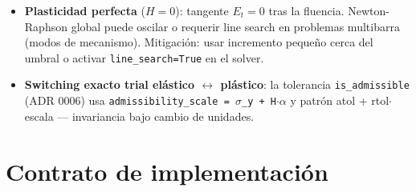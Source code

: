 \documentclass[11pt,letterpaper,oneside]{report}
\begin{document}
\begin{itemize}
  \item \textbf{Plasticidad perfecta} ($H = 0$): tangente $E_t = 0$ tras la fluencia. Newton-Raphson global puede oscilar o requerir line search en problemas multibarra (modos de mecanismo). Mitigación: usar incremento pequeño cerca del umbral o activar \texttt{line\_search=True} en el solver.
  \item \textbf{Switching exacto trial elástico \ensuremath{\leftrightarrow} plástico}: la tolerancia \texttt{is\_admissible} (ADR 0006) usa \texttt{admissibility\_scale = \ensuremath{\sigma}\_y + H\ensuremath{\cdot}\ensuremath{\alpha}} y patrón atol + rtol\ensuremath{\cdot}escala --- invariancia bajo cambio de unidades.
\end{itemize}


\section{Contrato de implementación}
\end{document}
